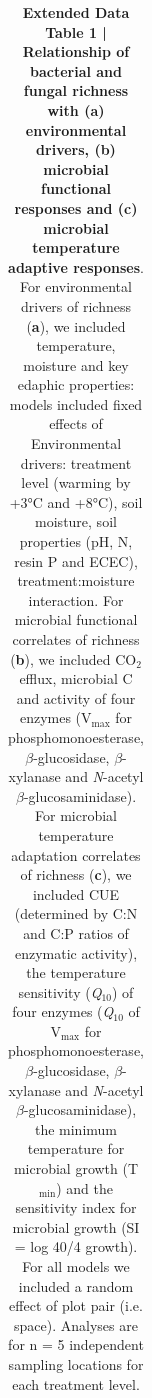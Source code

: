 \documentclass[
  letterpaper,
  DIV=11,
  numbers=noendperiod]{scrartcl}
\begin{document}
\begin{table}[H]

\caption{\textbf{Extended Data Table 1 |} \textbf{Relationship of bacterial and fungal richness with (a) environmental drivers, (b) microbial functional responses and (c) microbial temperature adaptive responses}. For environmental drivers of richness (\textbf{a}), we included temperature, moisture and key edaphic properties: models included fixed effects of Environmental drivers: treatment level (warming by +3°C and +8°C), soil moisture, soil properties (pH, N, resin P and ECEC), treatment:moisture interaction. For microbial functional correlates of richness (\textbf{b}), we included CO$_{2}$ efflux, microbial C and activity of four enzymes (V$_{\mathrm{max}}$ for phosphomonoesterase, $\beta$-glucosidase, $\beta$-xylanase and \textsl{N}-acetyl $\beta$-glucosaminidase). For microbial temperature adaptation correlates of richness (\textbf{c}), we included CUE (determined by C:N and C:P ratios of enzymatic activity), the temperature sensitivity (\textsl{Q}$_{10}$) of four enzymes (\textsl{Q}$_{10}$ of V$_{\mathrm{max}}$ for phosphomonoesterase, $\beta$-glucosidase, $\beta$-xylanase and \textsl{N}-acetyl $\beta$-glucosaminidase), the minimum temperature for microbial growth (T$_{\mathrm{min}}$) and the sensitivity index for microbial growth (SI = log 40/4 growth). For all models we included a random effect of plot pair (i.e. space). Analyses are for n = 5 independent sampling locations for each treatment level.}
\centering
\fontsize{8}{10}\selectfont
\begin{tabular}[t]{lccccc}


\end{tabular}
\end{table}
\end{document}
